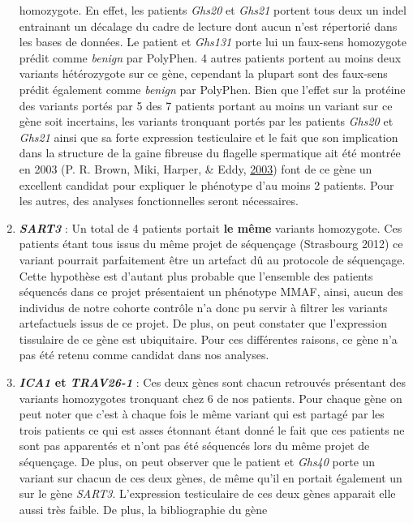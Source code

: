 \documentclass[12pt,twoside]{reedthesis}
\theoremstyle{definition}
\theoremstyle{definition}
\theoremstyle{remark}
\begin{document}
\begin{enumerate}
    homozygote. En effet, les patients \emph{Ghs20} et \emph{Ghs21}
    portent tous deux un indel entrainant un décalage du cadre de lecture
    dont aucun n'est répertorié dans les bases de données. Le patient et
    \emph{Ghs131} porte lui un faux-sens homozygote prédit comme
    \emph{benign} par PolyPhen. 4 autres patients portent au moins deux
    variants hétérozygote sur ce gène, cependant la plupart sont des
    faux-sens prédit également comme \emph{benign} par PolyPhen. Bien que
    l'effet sur la protéine des variants portés par 5 des 7 patients
    portant au moins un variant sur ce gène soit incertains, les variants
    tronquant portés par les patients \emph{Ghs20} et \emph{Ghs21} ainsi
    que sa forte expression testiculaire et le fait que son implication
    dans la structure de la gaine fibreuse du flagelle spermatique ait été
    montrée en 2003 (P. R. Brown, Miki, Harper, \& Eddy,
    \protect\hyperlink{ref-Brown2003}{2003}) font de ce gène un excellent
    candidat pour expliquer le phénotype d'au moins 2 patients. Pour les
    autres, des analyses fonctionnelles seront nécessaires.
  \item
    \textbf{\emph{SART3}} : Un total de 4 patients portait \textbf{le
    même} variants homozygote. Ces patients étant tous issus du même
    projet de séquençage (Strasbourg 2012) ce variant pourrait
    parfaitement être un artefact dû au protocole de séquençage. Cette
    hypothèse est d'autant plus probable que l'ensemble des patients
    séquencés dans ce projet présentaient un phénotype MMAF, ainsi, aucun
    des individus de notre cohorte contrôle n'a donc pu servir à filtrer
    les variants artefactuels issus de ce projet. De plus, on peut
    constater que l'expression tissulaire de ce gène est ubiquitaire. Pour
    ces différentes raisons, ce gène n'a pas été retenu comme candidat
    dans nos analyses.
  \item
    \textbf{\emph{ICA1} et \emph{TRAV26-1}} : Ces deux gènes sont chacun
    retrouvés présentant des variants homozygotes tronquant chez 6 de nos
    patients. Pour chaque gène on peut noter que c'est à chaque fois le
    même variant qui est partagé par les trois patients ce qui est asses
    étonnant étant donné le fait que ces patients ne sont pas apparentés
    et n'ont pas été séquencés lors du même projet de séquençage. De plus,
    on peut observer que le patient et \emph{Ghs40} porte un variant sur
    chacun de ces deux gènes, de même qu'il en portait également un sur le
    gène \emph{SART3}. L'expression testiculaire de ces deux gènes
    apparait elle aussi très faible. De plus, la bibliographie du gène

\end{enumerate}
\end{document}
